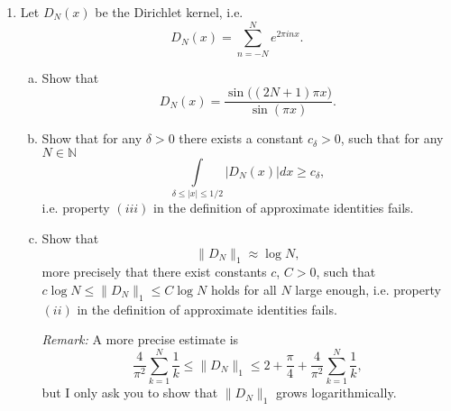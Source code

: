 \documentclass[a4paper]{article}
\newcommand{\Q}{\mathbb{Q}}
\begin{document}
\begin{enumerate}
\begin{proof}
    Thus, $\{f_{k_n}\}$ is a uniformly bounded and equicontinuous sequence of functions. Therefore, by Arzela-Ascoli, there is a further subsequence
    (which we will continue denoting by $\{ f_{k_n} \}$ that converges uniformly.

    Because $\{ f_{k_n} \}$ is a uniformly convergent sequence of continuous functions, it converges to a continuous function $f(x)$. As already
    stated $f(q) = 0$ for all $q \in \Q$, therefore $\|f\|_{L^2} = 0$. $f_{k_n} \to f$ uniformly implies $f_{k_n} \to f$ in $L^2$. Therefore,
    $\|f_{k_n}\|_{L^2} \to 0$, which contradicts $\|f_k\|_{L^2} = 1$ for all $k$. Therefore, there must be a point $x_1 \in [0,1]$ such that
    $f_{k_n}(x_1) \to y$ for some subsequence $\{ f_{k_n} \}$ and some $y \neq 0$.

    Then for $x \in [x_1 - \frac{y}{2C}, x_1 + \frac{y}{2C}]$, $|f(x)| \geq \frac{y}{2}.$ Then
    \begin{align*}
      \langle f, \chi_{[x_1 - \frac{y}{2C}, x_1 + \frac{y}{2C}]} \rangle_{L^2} &= \int_{x_1 - \frac{y}{2C}}^{x_1 + \frac{y}{2C}} |f(x)|^2 dx \\
      &\geq
    \end{align*}<++>

  \end{proof}

\item Let $D_N (x)$ be the Dirichlet kernel, i.e. $$ D_N (x) = \sum_{n=-N}^N e^{2\pi i nx}. $$

\begin{enumerate}[(a)]
\item Show that $$ D_N (x)  = \frac{\sin \big( (2N+1) \pi x\big)}{ \sin (\pi x)}. $$
\item Show that for any $\delta > 0$ there exists a constant $c_\delta >0$, such that for any $N \in \mathbb N$ $$ \int\limits_{\delta \le |x| \le 1/2} |D_N (x) | dx \ge c_\delta,$$
i.e. property $(iii)$ in the definition of approximate identities fails.
\item Show that   $$ \| D_N \|_1 \approx \log N,$$ more precisely that there exist constants $c$, $C>0$, such that $ c\log N \le  \| D_N \|_1 \le C \log N$ holds for all $N$ large enough,  i.e. property $(ii)$ in the definition of approximate identities fails.

{\it{Remark:}}  A more precise estimate is $$ \frac{4}{\pi^2} \sum_{k=1}^N \frac1{k} \le \| D_N \|_1 \le 2 + \frac{\pi}{4} +   \frac{4}{\pi^2} \sum_{k=1}^N \frac1{k},$$ but I only ask you to show that $\| D_N \|_1$ grows logarithmically.
\end{enumerate}


\end{enumerate}
\end{document}
